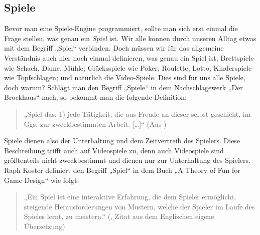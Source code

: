 \subsection{Spiele}	

Bevor man eine Spiele-Engine programmiert, sollte man sich erst einmal die Frage stellen, was genau ein \textit{Spiel} ist. Wir alle können durch unseren Alltag etwas mit dem Begriff „Spiel“ verbinden. Doch müssen wir für das allgemeine Verständnis auch hier noch einmal definieren, was genau ein Spiel ist;
Brettspiele wie Schach, Dame, Mühle; Glücksspiele wie Poker, Roulette, Lotto; Kinderspiele wie Topfschlagen; und natürlich die Video-Spiele. 
Dies sind für uns alle Spiele, doch warum?
Schlägt man den Begriff „Spiele“ in dem Nachschlagewerk „Der Brockhaus“ nach, so bekommt man die folgende Definition:

\begin{quote}
	„Spiel das, 1) jede Tätigkeit, die aus Freude an dieser selbst geschieht, im Ggs. zur zweckbestimmten Arbeit. […]“ (Aus \cite{brockhaus})
\end{quote}

Spiele dienen also der Unterhaltung und dem Zeitvertreib des Spielers.
Diese Beschreibung trifft auch auf Videospiele zu, denn auch Videospiele sind größtenteils nicht zweckbestimmt und dienen nur zur Unterhaltung des Spielers.
Raph Koster definiert den Begriff „Spiel“ in dem Buch „A Theory
of Fun for Game Design“ wie folgt:

\begin{quote}
	„Ein Spiel ist eine interaktive Erfahrung, die dem Spieler ermöglicht, steigende Herausforderungen von Mustern, welche der Spieler im Laufe des Spieles lernt, zu meistern.“
	(\cite{theoryoffun}, Zitat aus dem Englischen eigene Übersetzung)
\end{quote}